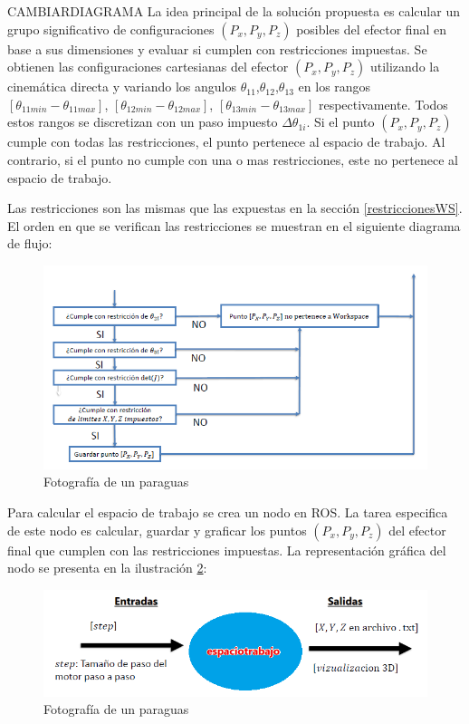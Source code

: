     CAMBIARDIAGRAMA La idea principal de la solución propuesta es calcular un grupo significativo de configuraciones $(P_x,P_y,P_z)$ posibles del efector final en base a sus dimensiones y evaluar si cumplen con restricciones impuestas. Se obtienen las configuraciones cartesianas del efector $(P_x,P_y,P_z)$  utilizando la cinemática directa y variando los angulos $\theta_{11}$,$\theta_{12}$,$\theta_{13}$ en los rangos $[\theta_{11min}-\theta_{11max}]$, $[\theta_{12min}-\theta_{12max}]$, $[\theta_{13min}-\theta_{13max}]$ respectivamente. Todos estos rangos se discretizan con un paso impuesto \(  \Delta  \theta _{1i} \). Si el punto  $(P_x,P_y,P_z)$ cumple con todas las restricciones, el punto pertenece al espacio de trabajo. Al contrario, si el punto no cumple con una o mas restricciones, este no pertenece al espacio de trabajo.

        \newpage

    Las restricciones son las mismas que las expuestas en la sección \ref{restriccionesWS}. El orden en que se verifican las restricciones se muestran en el siguiente diagrama de flujo:

             \begin{figure}[htb]
                \centering
                \includegraphics[width=1\linewidth]{Main/Chapter6/Images6/cap6_ws_3.png}
                \caption{Fotografía de un paraguas}
                \label{f:Cap6_ws_3}
            \end{figure}  


    Para calcular el espacio de trabajo se crea un nodo en ROS. La tarea especifica de este nodo es calcular, guardar y graficar los puntos $(P_x,P_y,P_z)$ del efector final que cumplen con las restricciones impuestas. 
    La representación gráfica del nodo se presenta en la ilustración \ref{f:Cap6_ws_1}: 
    
                \begin{figure}[htb]
                \centering
                \includegraphics[width=0.9\linewidth]{Main/Chapter6/Images6/cap6_ws_1.png}
                \caption{Fotografía de un paraguas}
                \label{f:Cap6_ws_1}
            \end{figure}  
    
